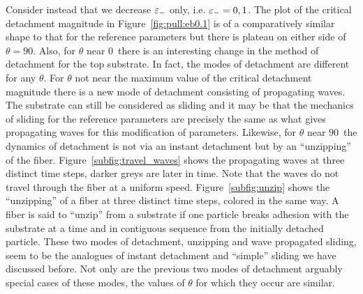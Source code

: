 Consider instead that we decrease $\varepsilon_-$ only, i.e. $\varepsilon_-=0,1$. The plot of the critical detachment magnitude in Figure~\ref{fig:pull:eb0.1} is of a comparatively similar shape to that for the reference parameters but there is plateau on either side of $\theta=90$\textdegree. Also, for $\theta$ near $0$\textdegree\ there is an interesting change in the method of detachment for the top substrate. In fact, the modes of detachment are different for any $\theta$. For $\theta$ not near the maximum value of the critical detachment magnitude there is a new mode of detachment consisting of propagating waves. The substrate can still be considered as sliding and it may be that the mechanics of sliding for the reference parameters are precisely the same as what gives propagating waves for this modification of parameters. Likewise, for $\theta$ near $90$\textdegree\ the dynamics of detachment is not via an instant detachment but by an ``unzipping'' of the fiber. Figure~\ref{subfig:travel_waves} shows the propagating waves at three distinct time steps, darker greys are later in time. Note that the waves do not travel through the fiber at a uniform speed. Figure~\ref{subfig:unzip} shows the ``unzipping'' of a fiber at three distinct time steps, colored in the same way. A fiber is said to ``unzip'' from a substrate if one particle breaks adhesion with the substrate at a time and in contiguous sequence from the initially detached particle. These two modes of detachment, unzipping and wave propagated sliding, seem to be the analogues of instant detachment and ``simple'' sliding we have discussed before. Not only are the previous two modes of detachment arguably special cases of these modes, the values of $\theta$ for which they occur are similar.

